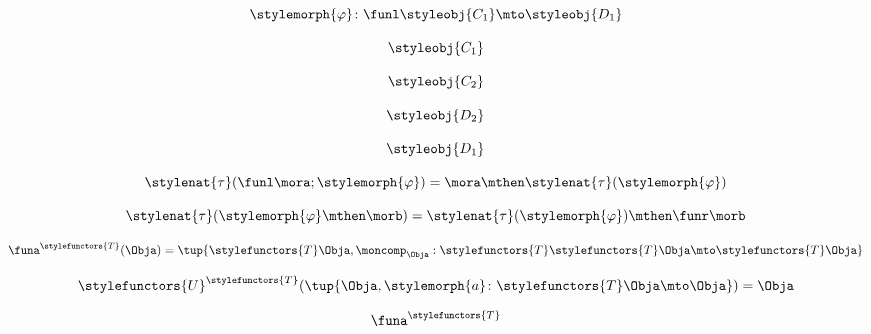 \begin{forslides}
    \begin{equation}
        \label{eq:slides_adjunctions_73}
        \stylemorph{\varphi} \colon \funl \styleobj{C_1} \mto \styleobj{D_1}
    \end{equation}

    \begin{equation}
        \label{eq:slides_adjunctions_74}
        \styleobj{C_1}
    \end{equation}

    \begin{equation}
        \label{eq:slides_adjunctions_75}
        \styleobj{C_2}
    \end{equation}

    \begin{equation}
        \label{eq:slides_adjunctions_76}
        \styleobj{D_2}
    \end{equation}

    \begin{equation}
        \label{eq:slides_adjunctions_77}
        \styleobj{D_1}
    \end{equation}

    \begin{equation}
        \label{eq:slides_adjunctions_78}
        \stylenat{\tau} (\funl \mora; \stylemorph{\varphi}) = \mora \mthen \stylenat{\tau}(\stylemorph{\varphi})
    \end{equation}

    \begin{equation}
        \label{eq:slides_adjunctions_79}
        \stylenat{\tau} (\stylemorph{\varphi} \mthen \morb) =  \stylenat{\tau}(\stylemorph{\varphi}) \mthen \funr \morb
    \end{equation}

    \begin{equation}
        \label{eq:slides_adjunctions_80}
        \funa^{\stylefunctors{T}}(\Obja) = \tup{ \stylefunctors{T} \Obja, \moncomp_{\Obja} : \stylefunctors{T} \stylefunctors{T} \Obja \mto \stylefunctors{T} \Obja}
    \end{equation}

    \begin{equation}
        \label{eq:slides_adjunctions_81}
        \stylefunctors{U}^{\stylefunctors{T}}( \tup{\Obja, \stylemorph{a} \colon \stylefunctors{T} \Obja \mto \Obja}) = \Obja
    \end{equation}

    \begin{equation}
        \label{eq:slides_adjunctions_82}
        \funa^{\stylefunctors{T}}
    \end{equation}


\end{forslides}
